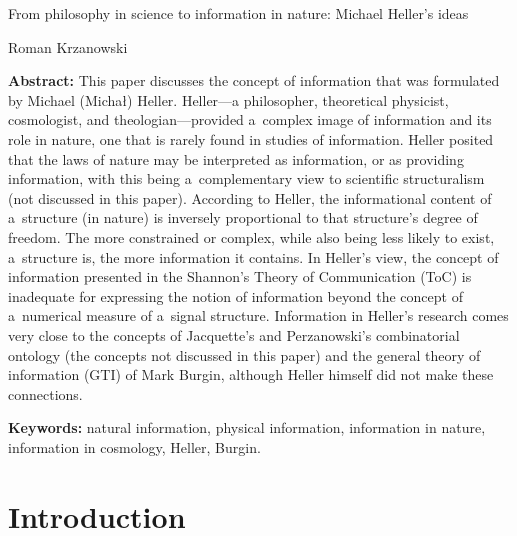 \setcounter{secnumdepth}{0}







From philosophy in science to information in nature: Michael Heller's ideas





Roman Krzanowski





\textbf{Abstract:} This paper discusses the concept of information that was formulated by Michael (Michał) Heller. Heller---a philosopher, theoretical physicist, cosmologist, and theologian---provided a~complex image of information and its role in nature, one that is rarely found in studies of information. Heller posited that the laws of nature may be interpreted as information, or as providing information, with this being a~complementary view to scientific structuralism (not discussed in this paper). According to Heller, the informational content of a~structure (in nature) is inversely proportional to that structure's degree of freedom. The more constrained or complex, while also being less likely to exist, a~structure is, the more information it contains. In Heller's view, the concept of information presented in the Shannon's Theory of Communication (ToC) is inadequate for expressing the notion of information beyond the concept of a~numerical measure of a~signal structure. Information in Heller's research comes very close to the concepts of Jacquette's and Perzanowski's combinatorial ontology (the concepts not discussed in this paper) and the general theory of information (GTI) of Mark Burgin, although Heller himself did not make these connections.



\textbf{Keywords:} natural information, physical information, information in nature, information in cosmology, Heller, Burgin.



\section{Introduction}

